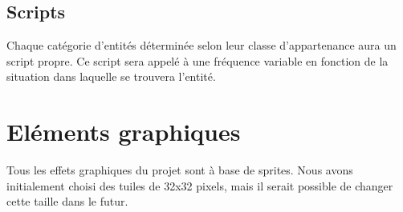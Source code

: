 \documentclass[a4paper]{memoir}
\begin{document}
			\subsection{Scripts}
				Chaque catégorie d'entités déterminée selon leur classe d'appartenance aura un script propre. Ce script sera appelé à une fréquence variable en fonction de la situation dans laquelle se trouvera l'entité.
			
		\section{Eléments graphiques}
			Tous les effets graphiques du projet sont à base de sprites. Nous avons initialement choisi des tuiles de 32x32 pixels, mais il serait possible de changer cette taille dans le futur.\\
\end{document}
